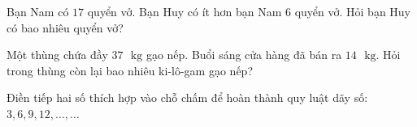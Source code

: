 \begin{bt}[1,5 điểm]
Bạn Nam có $17$ quyển vở. Bạn Huy có ít hơn bạn Nam $6$ quyển vở. Hỏi bạn Huy có bao nhiêu quyển vở?
\end{bt}

\begin{bt}[1,0 điểm]
Một thùng chứa đầy $37\text{ }\text{kg}$ gạo nếp. Buổi sáng cửa hàng đã bán ra $14\text{ }\text{kg}$. Hỏi trong thùng còn lại bao nhiêu ki-lô-gam gạo nếp?
\end{bt}

\begin{bt}[1,0 điểm]
Điền tiếp hai số thích hợp vào chỗ chấm để hoàn thành quy luật dãy số: $3, 6, 9, 12, \dots, \dots$
\end{bt}
